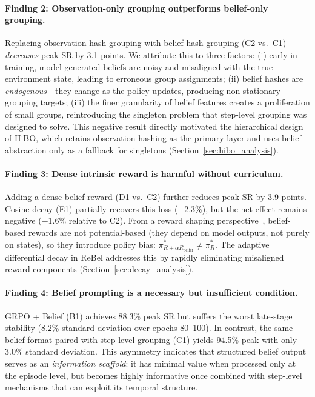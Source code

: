 \paragraph{Finding 2: Observation-only grouping outperforms belief-only grouping.}
Replacing observation hash grouping with belief hash grouping (C2 vs.\ C1)
\emph{decreases} peak SR by 3.1 points.
We attribute this to three factors:
(i) early in training, model-generated beliefs are noisy and misaligned with
the true environment state, leading to erroneous group assignments;
(ii) belief hashes are \emph{endogenous}---they change as the policy updates,
producing non-stationary grouping targets;
(iii) the finer granularity of belief features creates a proliferation of
small groups, reintroducing the singleton problem that step-level grouping
was designed to solve.
This negative result directly motivated the hierarchical design of HiBO,
which retains observation hashing as the primary layer and uses belief
abstraction only as a fallback for singletons (Section~\ref{sec:hibo_analysis}).

\paragraph{Finding 3: Dense intrinsic reward is harmful without curriculum.}
Adding a dense belief reward (D1 vs.\ C2) further reduces peak SR by 3.9 points.
Cosine decay (E1) partially recovers this loss (+2.3\%), but the net effect
remains negative ($-$1.6\% relative to C2).
From a reward shaping perspective~\citep{ng1999policy}, belief-based rewards
are not potential-based (they depend on model outputs, not purely on states),
so they introduce policy bias: $\pi^*_{R + \alpha R_{\text{belief}}} \neq \pi^*_R$.
The adaptive differential decay in ReBel addresses this by rapidly
eliminating misaligned reward components (Section~\ref{sec:decay_analysis}).

\paragraph{Finding 4: Belief prompting is a necessary but insufficient condition.}
GRPO + Belief (B1) achieves 88.3\% peak SR but suffers the worst late-stage
stability (8.2\% standard deviation over epochs 80--100).
In contrast, the same belief format paired with step-level grouping (C1)
yields 94.5\% peak with only 3.0\% standard deviation.
This asymmetry indicates that structured belief output serves as an
\emph{information scaffold}: it has minimal value when processed only at the
episode level, but becomes highly informative once combined with step-level
mechanisms that can exploit its temporal structure.


